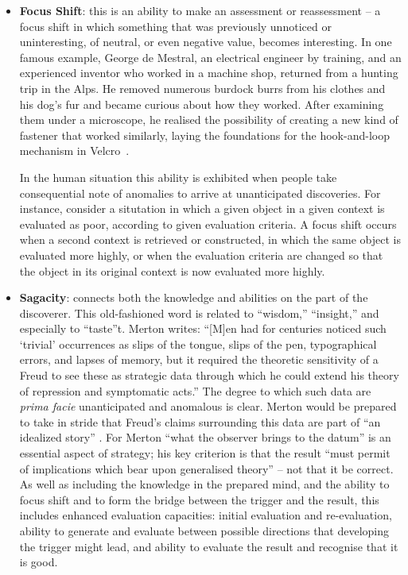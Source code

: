 \begin{itemize}
\item \textbf{Focus Shift}: this is an ability to make an assessment
  or reassessment -- a focus shift in which something that was
  previously unnoticed or uninteresting, of neutral, or even negative
  value, becomes interesting.  In one famous example, George de
  Mestral, an electrical engineer by training, and an experienced
  inventor who worked in a machine shop, returned from a hunting trip
  in the Alps. He removed numerous burdock burrs from his clothes and
  his dog's fur and became curious about how they worked. After
  examining them under a microscope, he realised the possibility of
  creating a new kind of fastener that worked similarly, laying the
  foundations for the hook-and-loop mechanism in Velcro\texttrademark\
  \cite{roberts}. 

  In the human situation this ability is exhibited when people take
  consequential note of anomalies to arrive at unanticipated
  discoveries. For instance, consider a situtation in which a given
  object in a given context is evaluated as poor, according to given
  evaluation criteria. A focus shift occurs when a second context is
  retrieved or constructed, in which the same object is evaluated more
  highly, or when the evaluation criteria are changed so that the
  object in its original context is now evaluated more highly.
\end{itemize}

\begin{itemize}
\item \textbf{Sagacity}: connects both the knowledge and abilities on
  the part of the discoverer. This old-fashioned word is related to
  ``wisdom,'' ``insight,'' and especially to ``taste''t.  Merton
  \cite[p.~507]{merton1948bearing} writes: ``{[}M{]}en had for
  centuries noticed such `trivial' occurrences as slips of the tongue,
  slips of the pen, typographical errors, and lapses of memory, but it
  required the theoretic sensitivity of a Freud to see these as
  strategic data through which he could extend his theory of
  repression and symptomatic acts.''  The degree to which such data
  are \emph{prima facie} unanticipated and anomalous is clear.  Merton
  would be prepared to take in stride that Freud's claims surrounding
  this data are part of ``an idealized story'' \cite{freudtheory}.
  For Merton ``what the observer brings to the datum'' is an essential
  aspect of strategy; his key criterion is that the result ``must
  permit of implications which bear upon generalised theory'' -- not
  that it be correct. As well as including the knowledge in the
  prepared mind, and the ability to focus shift and to form the bridge
  between the trigger and the result, this includes enhanced
  evaluation capacities: initial evaluation and re-evaluation, ability
  to generate and evaluate between possible directions that developing
  the trigger might lead, and ability to evaluate the result and
  recognise that it is good.
\end{itemize}

